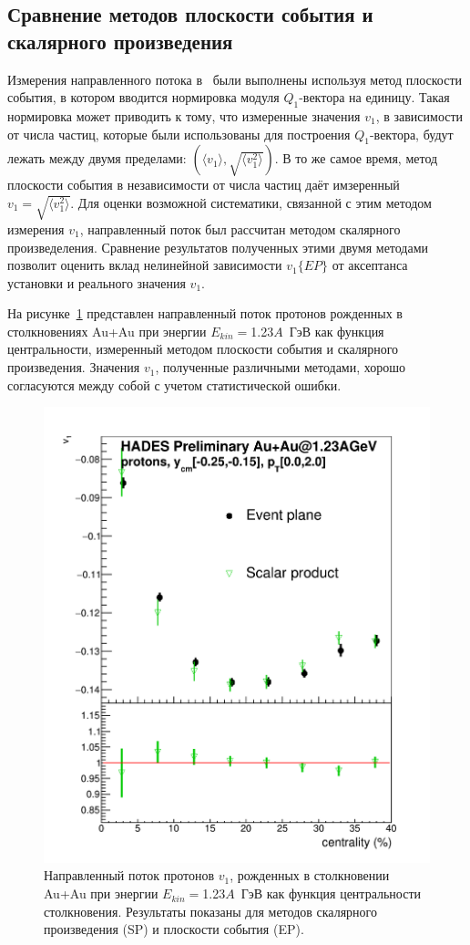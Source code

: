 \subsection{Сравнение методов плоскости события и скалярного произведения}

Измерения направленного потока в~\cite{HADES:2020lob} были выполнены используя метод плоскости события, в котором вводится нормировка модуля $Q_1$-вектора на единицу. 
Такая нормировка может приводить к тому, что измеренные значения $v_1$, в зависимости от числа частиц, которые были использованы для построения $Q_1$-вектора, будут лежать между двумя пределами: $(\langle v_1 \rangle , \sqrt{ \langle v_1^2 \rangle })$.
В то же самое время, метод плоскости события в независимости от числа частиц даёт имзеренный $v_1 = \sqrt{ \langle v_1^2 \rangle }$.
Для оценки возможной систематики, связанной с этим методом измерения $v_1$, направленный поток был рассчитан методом скалярного произведеления.
Сравнение результатов полученных этими двумя методами позволит оценить вклад нелинейной зависимости $v_1\{EP\}$ от аксептанса установки и реального значения $v_1$.

На рисунке~\ref{fig:hades_ep_vs_sp} представлен направленный поток протонов рожденных в столкновениях Au+Au при энергии $E_{kin}=$1.23$A$~ГэВ как функция центральности, измеренный методом плоскости события и скалярного произведения. 
Значения $v_1$, полученные различными методами, хорошо согласуются между собой с учетом статистической ошибки. 
%
\begin{figure}[ht]
\begin{center}
\includegraphics[width=0.45\linewidth]{images/EP_vs_SP.png}
\caption{Направленный поток протонов $v_1$, рожденных в столкновении Au+Au при энергии $E_{kin}=$1.23$A$~ГэВ как функция центральности столкновения. Результаты показаны для методов скалярного произведения (SP) и плоскости события (EP).}
\label{fig:hades_ep_vs_sp}
\end{center}
\end{figure}

